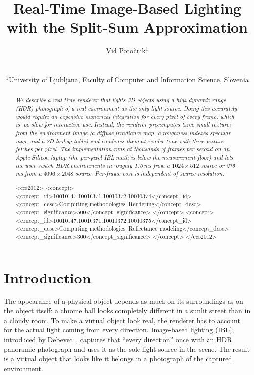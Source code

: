 \documentclass{egpubl}
\title[Real-Time IBL with Split-Sum]%
      {Real-Time Image-Based Lighting with the Split-Sum Approximation}
\author[V. Poto\v{c}nik]
{\parbox{\textwidth}{\centering Vid Poto\v{c}nik$^{1}$}
 \\
 {\parbox{\textwidth}{\centering
   $^1$University of Ljubljana, Faculty of Computer and Information Science, Slovenia
 }}
}
\begin{document}
\maketitle

\begin{abstract}
\textit{We describe a real-time renderer that lights 3D objects using a
high-dynamic-range (HDR) photograph of a real environment as the only light
source. Doing this accurately would require an expensive numerical integration
for every pixel of every frame, which is too slow for interactive use. Instead,
the renderer precomputes three small textures from the environment image (a
diffuse irradiance map, a roughness-indexed specular map, and a 2D lookup
table) and combines them at render time with three texture fetches per pixel.
The implementation runs at thousands of frames per second on an Apple Silicon
laptop (the per-pixel IBL math is below the measurement floor) and lets the
user switch HDR environments in roughly 110\,ms from a $1024\!\times\!512$
source or 275\,ms from a $4096\!\times\!2048$ source. Per-frame cost is
independent of source resolution.}

\begin{CCSXML}
<ccs2012>
<concept>
<concept_id>10010147.10010371.10010372.10010374</concept_id>
<concept_desc>Computing methodologies~Rendering</concept_desc>
<concept_significance>500</concept_significance>
</concept>
<concept>
<concept_id>10010147.10010371.10010372.10010375</concept_id>
<concept_desc>Computing methodologies~Reflectance modeling</concept_desc>
<concept_significance>300</concept_significance>
</concept>
</ccs2012>
\end{CCSXML}


\printccsdesc
\end{abstract}

\section{Introduction}

The appearance of a physical object depends as much on its surroundings as on
the object itself: a chrome ball looks completely different in a sunlit street
than in a cloudy room. To make a virtual object look real, the renderer has to
account for the actual light coming from every direction. Image-based lighting
(IBL), introduced by Debevec~\cite{Debevec1998,Debevec2006}, captures that
``every direction'' once with an HDR panoramic photograph and uses it as the
sole light source in the scene. The result is a virtual object that looks like
it belongs in a photograph of the captured environment.
\end{document}
